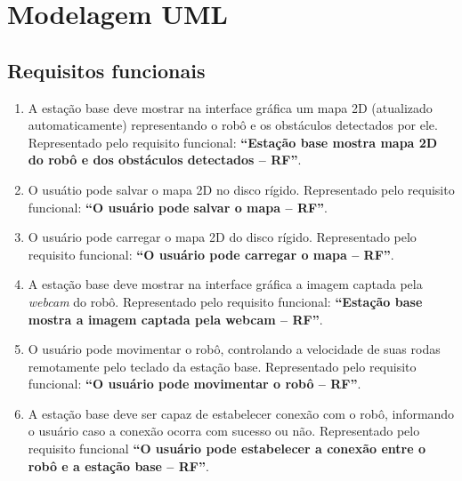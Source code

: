 \chapter{Modelagem UML}

\section{Requisitos funcionais}

\begin{enumerate}[topsep=0pt, partopsep=0pt, itemsep=0pt]
  \item A estação base deve mostrar na interface gráfica um mapa 2D (atualizado automaticamente) representando o robô e os obstáculos detectados por ele. Representado pelo requisito funcional: \textbf{``Estação base mostra mapa 2D do robô e dos obstáculos detectados -- RF''}.
  \item O usuátio pode salvar o mapa 2D no disco rígido. Representado pelo requisito funcional: \textbf{``O usuário pode salvar o mapa -- RF''}.
  \item O usuário pode carregar o mapa 2D do disco rígido. Representado pelo requisito funcional: \textbf{``O usuário pode carregar o mapa -- RF''}.
  \item A estação base deve mostrar na interface gráfica a imagem captada pela \textit{webcam} do robô. Representado pelo requisito funcional: \textbf{``Estação base mostra a imagem captada pela webcam -- RF''}.
  \item O usuário pode movimentar o robô, controlando a velocidade de suas rodas remotamente pelo teclado da estação base. Representado pelo requisito funcional: \textbf{``O usuário pode movimentar o robô -- RF''}.
  \item A estação base deve ser capaz de estabelecer conexão com o robô, informando o usuário caso a conexão ocorra com sucesso ou não. Representado pelo requisito funcional \textbf{``O usuário pode estabelecer a conexão entre o robô e a estação base -- RF''}.
\end{enumerate}

